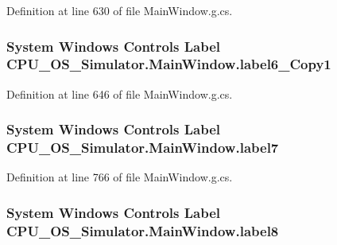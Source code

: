 Definition at line 630 of file Main\+Window.\+g.\+cs.

\hypertarget{class_c_p_u___o_s___simulator_1_1_main_window_a890bd54d36af19ec881b6a840d6ac8a9}{}
\subsubsection[{label6\+\_\+\+Copy1}]{\setlength{\rightskip}{0pt plus 5cm}System Windows Controls Label C\+P\+U\+\_\+\+O\+S\+\_\+\+Simulator.\+Main\+Window.\+label6\+\_\+\+Copy1\hspace{0.3cm}{\ttfamily [package]}}\label{class_c_p_u___o_s___simulator_1_1_main_window_a890bd54d36af19ec881b6a840d6ac8a9}


Definition at line 646 of file Main\+Window.\+g.\+cs.

\hypertarget{class_c_p_u___o_s___simulator_1_1_main_window_a38ed6363fd03954967bda7a099f6b07e}{}
\subsubsection[{label7}]{\setlength{\rightskip}{0pt plus 5cm}System Windows Controls Label C\+P\+U\+\_\+\+O\+S\+\_\+\+Simulator.\+Main\+Window.\+label7\hspace{0.3cm}{\ttfamily [package]}}\label{class_c_p_u___o_s___simulator_1_1_main_window_a38ed6363fd03954967bda7a099f6b07e}


Definition at line 766 of file Main\+Window.\+g.\+cs.

\hypertarget{class_c_p_u___o_s___simulator_1_1_main_window_a216fc6a1692d8a8f8b80b08348c1dcd4}{}
\subsubsection[{label8}]{\setlength{\rightskip}{0pt plus 5cm}System Windows Controls Label C\+P\+U\+\_\+\+O\+S\+\_\+\+Simulator.\+Main\+Window.\+label8\hspace{0.3cm}{\ttfamily [package]}}\label{class_c_p_u___o_s___simulator_1_1_main_window_a216fc6a1692d8a8f8b80b08348c1dcd4}


